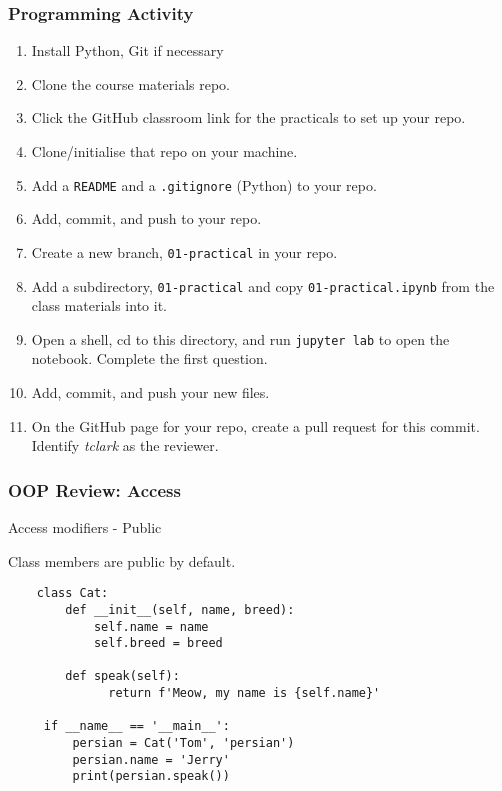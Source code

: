 \documentclass[10pt]{beamer}
\begin{document}
\begin{frame}
  \frametitle{Programming Activity}
  
  \begin{enumerate}
    \item Install Python, Git if necessary
    \item Clone the course materials repo.
    \item Click the GitHub classroom link for the practicals to set up your repo.
    \item Clone/initialise that repo on your machine.
    \item Add a \texttt{README} and a \texttt{.gitignore} (Python) to your repo.
    \item Add, commit, and push to your repo.
    \item Create a new branch, \texttt{01-practical} in your repo.
    \item Add a subdirectory,  \texttt{01-practical} and copy \texttt{01-practical.ipynb} from the class materials into it.
    \item Open a shell, cd to this directory, and run \texttt{jupyter lab} to open the notebook. Complete the first question.
    \item Add, commit, and push your new files.
    \item On the GitHub page for your repo, create a pull request for this commit. Identify \emph{tclark} as the reviewer.
  \end{enumerate}      
\end{frame}


\begin{frame}[fragile]
  \frametitle{OOP Review: Access}
  
   Access modifiers - Public
   
   Class members are public by default.
   
   \begin{verbatim}
    class Cat:
        def __init__(self, name, breed):
            self.name = name
            self.breed = breed
            
        def speak(self):
              return f'Meow, my name is {self.name}'
              
     if __name__ == '__main__':
         persian = Cat('Tom', 'persian')
         persian.name = 'Jerry'
         print(persian.speak())
    \end{verbatim}     
     
\end{frame}
\end{document}
